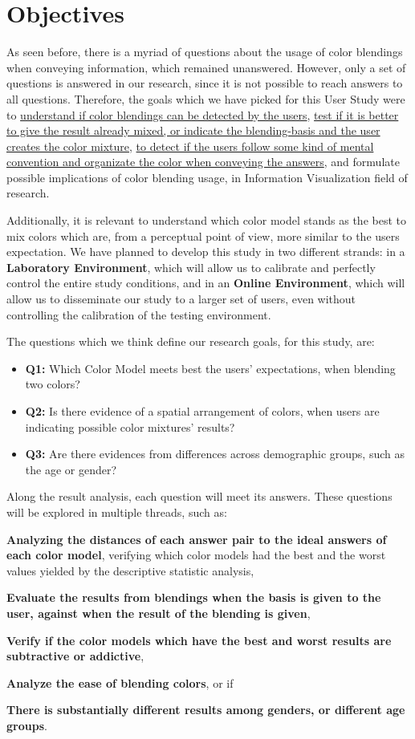 \section{Objectives}
\label{sec:impl_objectives}
%
As seen before, there is a myriad of questions about the usage of color blendings when conveying information,
which remained unanswered. However, only a set of questions is answered in our research, since it is not possible
to reach answers to all questions. Therefore, the goals which we have picked for this User Study were to
\ul{understand if color blendings can be detected by the users}, \ul{test if it is better to give the result
already mixed, or indicate the blending-basis and the user creates the color mixture}, \ul{to detect if the users
follow some kind of mental convention and organizate the color when conveying the answers}, and formulate possible
implications of color blending usage, in Information Visualization field of research. \par
%
Additionally, it is relevant to understand which color model stands as the best to mix colors which are, from a
perceptual point of view, more similar to the users expectation. We have planned to develop this study in two
different strands: in a \textbf{Laboratory Environment}, which will allow us to calibrate and perfectly control the
entire study conditions, and in an \textbf{Online Environment}, which will allow us to disseminate our study to a
larger set of users, even without controlling the calibration of the testing environment. \par
%
The questions which we think define our research goals, for this study, are:
%
\begin{itemize}
	\item \textbf{Q1:} Which Color Model meets best the users' expectations, when blending two colors?
	\item \textbf{Q2:} Is there evidence of a spatial arrangement of colors, when users are indicating possible color
	mixtures' results?
	\item \textbf{Q3:} Are there evidences from differences across demographic groups, such as the age or gender?
\end{itemize}
%
Along the result analysis, each question will meet its answers. These questions will be explored in multiple
threads, such as:
%
\begin{enumerate*}
		\item \textbf{Analyzing the distances of each answer pair to the ideal answers of each color model}, verifying
		which color models had the best and the worst values yielded by the descriptive statistic analysis,
		\item \textbf{Evaluate the results from blendings when the basis is given to the user, against when the result
		of the blending is given},
		\item \textbf{Verify if the color models which have the best and worst results are subtractive or addictive},
		\item \textbf{Analyze the ease of blending colors}, or if
		\item \textbf{There is substantially different results among genders, or different age groups}.
\end{enumerate*}
